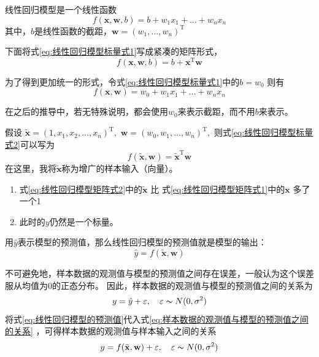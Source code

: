 \documentclass[withoutpreface,bwprint]{NoteBook}
\begin{document}
线性回归模型是一个线性函数
\begin{equation}
    \label{eq:线性回归模型标量式1}  %
    f(\mathbf{x},\mathbf{w},b) = b + w_1 x_1 + \dots + w_n x_n 
\end{equation}
其中，$b$是线性函数的截距，$\mathbf{w} = (w_1, \dots, w_n)^\mathrm{T}$

下面将式\cref{eq:线性回归模型标量式1}写成紧凑的矩阵形式，
\begin{equation}
    \label{eq:线性回归模型矩阵式1}  %
    f(\mathbf{x},\mathbf{w},b)  = b + \mathbf{x}^\mathrm{T} \mathbf{w} 
\end{equation}


为了得到更加统一的形式，令式\cref{eq:线性回归模型标量式1}中的$b=w_0$
则有
\begin{equation}
    \label{eq:线性回归模型标量式2}  %
    f(\mathbf{x},\mathbf{w}) = w_0 + w_1 x_1 + \dots + w_n x_n 
\end{equation}

在之后的推导中，若无特殊说明，都会使用$w_0$来表示截距，而不用$b$来表示。

假设
$\tilde{\mathbf{x}} = (1, x_1, x_2, \dots, x_n)^\mathrm{T}, $ %
$\mathbf{w} = (w_0, w_1, \dots, w_n)^\mathrm{T},$
则式\cref{eq:线性回归模型标量式2}可以写为
\begin{equation}
    \label{eq:线性回归模型矩阵式2}  %
    f(\tilde{\mathbf{x}},\mathbf{w}) = \tilde{\mathbf{x}}^\mathrm{T} \mathbf{w}
\end{equation}
在这里，我将$\tilde{\mathbf{x}} $称为增广的样本输入（向量）。

\begin{tcolorbox}[title={注意：},fonttitle=\bfseries,colframe=red!70!black,colback=red!10!white]
\begin{enumerate}
    \item 式\cref{eq:线性回归模型矩阵式2}中的$\tilde{\mathbf{x}}$ 比 式\cref{eq:线性回归模型矩阵式1}中的$\mathbf{x}$ 多了一个1
    \item 此时的$y$仍然是一个标量。
\end{enumerate}
\end{tcolorbox}


用$\hat{y}$表示模型的预测值，那么线性回归模型的预测值就是模型的输出：
\begin{equation}
    \label{eq:线性回归模型的预测值}
    \hat{y}=f(\tilde{\mathbf{x}},\mathbf{w}) 
\end{equation}

不可避免地，样本数据的观测值与模型的预测值之间存在误差，一般认为这个误差服从均值为0的正态分布。
因此，样本数据的观测值与模型的预测值之间的关系为
\begin{equation}
    \label{eq:样本数据的观测值与模型的预测值之间的关系} 
    y=\hat{y}+\varepsilon, \quad \varepsilon \thicksim  N(0,\sigma ^2)
\end{equation}
将式\cref{eq:线性回归模型的预测值}代入式\cref{eq:样本数据的观测值与模型的预测值之间的关系} ，可得样本数据的观测值与样本输入之间的关系
\begin{equation}
    \label{eq:样本数据的观测值与样本输入之间的关系} 
    y=f(\tilde{\mathbf{x}},\mathbf{w}) +\varepsilon, \quad \varepsilon \thicksim  N(0,\sigma ^2)
\end{equation}
\end{document}
